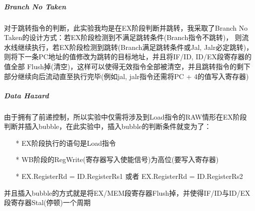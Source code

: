 \subparagraph{Branch No Taken}
对于跳转指令的判断，此实验我均是在EX阶段判断并跳转，我采取了Branch No Taken的设计方式：若EX阶段检测到不满足跳转条件(Branch指令不跳转)，
则流水线继续执行，若EX阶段检测到跳转(Branch满足跳转条件或Jal, Jalr必定跳转)，则将下一条PC地址的值修改为跳转的目标地址，并且将IF/ID, ID/EX段寄存器的值全部
Flush掉(清空)，这样可以使得无效指令全部被清空，并且跳转指令的剩下部分继续向后流动直至执行完毕(例如jal, jalr指令还需将PC + 4的值写入寄存器)

\subparagraph{Data Hazard}
由于拥有了前递控制，所以实验中仅需将涉及到Load指令的RAW情形在EX阶段判断并插入bubble，在此实验中，插入bubble的判断条件就变为了：
\begin{itemize}
    \item [*] EX阶段执行的语句是Load指令
    \item [*] WB阶段的RegWrite(寄存器写入使能信号)为高位(要写入寄存器)
    \item [*] EX.RegisterRd = ID.RegisterRs1 或者 EX.RegisterRd = ID.RegisterRs2
\end{itemize}
并且插入bubble的方式就是将EX/MEM段寄存器Flush掉，并使得IF/ID与ID/EX段寄存器Stal(停顿)一个周期